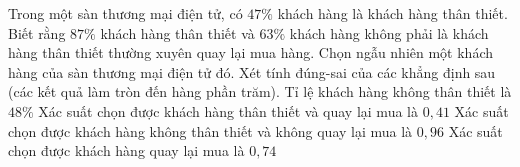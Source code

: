 \begin{ex}
	Trong một sàn thương mại điện tử, có $47\%$ khách hàng là khách hàng thân thiết. Biết rằng $87\%$ khách hàng thân thiết và $63\% $ khách hàng không phải là khách hàng thân thiết thường xuyên quay lại mua hàng. Chọn ngẫu nhiên một khách hàng của sàn thương mại điện tử đó. Xét tính đúng-sai của các khẳng định sau (các kết quả làm tròn đến hàng phần trăm).
	\choiceTF
	{ Tỉ lệ khách hàng không thân thiết là $48\%$ }
	{ \True  Xác suất chọn được khách hàng thân thiết và quay lại mua là  ${0,41}$ }
	{ Xác suất chọn được khách hàng không thân thiết và không quay lại mua là ${0,96}$ }
	{ \True  Xác suất chọn được khách hàng quay lại mua là ${0,74}$ }
	\end{ex}
